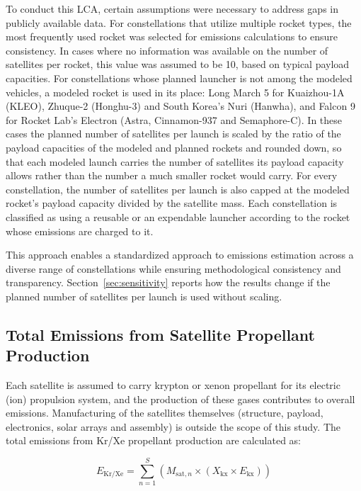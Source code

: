 \documentclass[pdflatex,sn-mathphys-num]{sn-jnl}
\theoremstyle{thmstyleone}%
\theoremstyle{thmstyletwo}%
\theoremstyle{thmstylethree}%
\begin{document}
To conduct this LCA, certain assumptions were necessary to address gaps in publicly available data. For constellations that utilize multiple rocket types, the most frequently used rocket was selected for emissions calculations to ensure consistency. In cases where no information was available on the number of satellites per rocket, this value was assumed to be 10, based on typical payload capacities. For constellations whose planned launcher is not among the modeled vehicles, a modeled rocket is used in its place: Long March 5 for Kuaizhou-1A (KLEO), Zhuque-2 (Honghu-3) and South Korea's Nuri (Hanwha), and Falcon 9 for Rocket Lab's Electron (Astra, Cinnamon-937 and Semaphore-C). In these cases the planned number of satellites per launch is scaled by the ratio of the payload capacities of the modeled and planned rockets and rounded down, so that each modeled launch carries the number of satellites its payload capacity allows rather than the number a much smaller rocket would carry. For every constellation, the number of satellites per launch is also capped at the modeled rocket's payload capacity divided by the satellite mass. Each constellation is classified as using a reusable or an expendable launcher according to the rocket whose emissions are charged to it.

This approach enables a standardized approach to emissions estimation across a diverse range of constellations while ensuring methodological consistency and transparency. Section~\ref{sec:sensitivity} reports how the results change if the planned number of satellites per launch is used without scaling.

\subsection{Total Emissions from Satellite Propellant Production}

Each satellite is assumed to carry krypton or xenon propellant for its electric (ion) propulsion system, and the production of these gases contributes to overall emissions. Manufacturing of the satellites themselves (structure, payload, electronics, solar arrays and assembly) is outside the scope of this study. The total emissions from Kr/Xe propellant production are calculated as:

\begin{equation}
E_{\text{Kr/Xe}} = \sum_{n=1}^{S} \left( M_{\text{sat},n} \times \left( X_{\text{kx}} \times E_{\text{kx}} \right) \right)
\end{equation}
\end{document}
